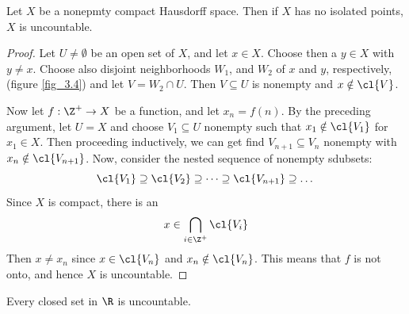 \begin{theorem}\label{3.6.7}
    Let $X$ be a nonepmty compact Hausdorff space. Then if $X$ has no isolated
    points,  $X$ is uncountable.
\end{theorem}
\begin{proof}
    Let $U \neq \emptyset$ be an open set of  $X$, and let  $x \in X$. Choose
    then a  $y \in X$ with  $y \neq x$. Choose also disjoint neighborhoods
    $W_1$, and $W_2$ of $x$ and  $y$, respectively, (figure \ref{fig_3.4}) and
    let  $V=W_2 \cap U$. Then $V \subseteq U$ is nonempty and  $x \notin
    \cl{V}$.

    Now let $f:\Z^+ \rightarrow X$ be a function, and let $x_n=f(n)$. By the
    preceding argument, let $U=X$ and choose  $V_1 \subseteq U$ nonempty such
    that $x_1 \notin \cl{V_1}$ for $x_1 \in X$. Then proceeding inductively,
    we can get find $V_{n+1} \subseteq V_n$ nonempty with $x_n \notin
    \cl{V_{n+1}}$. Now, consider the nested sequence of nonempty sdubsets:
    \begin{equation*}
        \cl{V_1} \supseteq \cl{V_2} \supseteq \dots \supseteq \cl{V_{n+1}}
        \supseteq \dots
    \end{equation*}
    Since $X$ is compact, there is an
    \begin{equation*}
        x \in \bigcap_{i \in \Z^+}{\cl{V_i}}
    \end{equation*}
    Then $x \neq x_n$ since  $x \in \cl{V_n}$ and $x_n \notin \cl{V_n}$. This
    means that $f$ is not onto, and hence $X$ is uncountable.
\end{proof}
\begin{corollary}
    Every closed set in $\R$ is uncountable.
\end{corollary}
